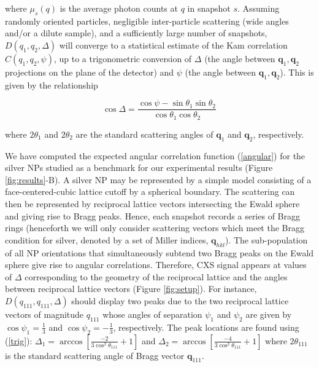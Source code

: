 \documentclass [11pt,fleqn]{article}
\def \be {\begin{equation}}
\def \ee {\end{equation}}
\begin{document}
where $\mu_s( q)$ is the average photon counts at $q$ in snapshot $s$. Assuming randomly oriented particles, negligible inter-particle scattering (wide angles and/or a dilute sample), and a sufficiently large number of snapshots, $D (q_1,q_2, \Delta)$ will converge to a statistical estimate of the Kam correlation $C (q_1,q_2, \psi)$, up to a trigonometric conversion of $\Delta$ (the angle between $\bm q_1, \bm q_2$ projections on the plane of the detector) and $\psi$ (the angle between $\bm q_1, \bm q_2$). This is given by the relationship

\be\label{trig}
\cos \Delta = \frac{\cos \psi - \sin \theta_1 \sin \theta_2  }{ \cos \theta_1 \cos \theta_2} 
\ee

where $2 \theta_1$ and $2 \theta_2$ are the standard scattering angles of $\bm q_1$ and $\bm q_2$, respectively.

We have computed the expected angular correlation function (\ref{angular}) for the silver NPs studied as a benchmark for our experimental results (Figure \ref{fig:results}-B). A silver NP may be represented by a simple model consisting of a face-centered-cubic lattice cutoff by a spherical boundary. The scattering can then be represented by reciprocal lattice vectors intersecting the Ewald sphere and giving rise to Bragg peaks. Hence, each snapshot records a series of Bragg rings (henceforth we will only consider scattering vectors which meet the Bragg condition for silver, denoted by a set of Miller indices, $\bm q_{hkl}$). The sub-population of all NP orientations that simultaneously subtend two Bragg peaks on the Ewald sphere give rise to angular correlations. Therefore,  CXS signal appears at values of $\Delta $ corresponding to the geometry of the reciprocal lattice and the angles between reciprocal lattice vectors (Figure \ref{fig:setup}). For instance, $D (q_{111},q_{111}, \Delta  )$ should display two peaks due to the two reciprocal lattice vectors of magnitude $q_{111}$ whose angles of separation $\psi_1$ and $\psi_2$ are given by $\cos \psi_1 = \frac{1}{3}$ and $\cos \psi_2 = -\frac{1}{3} $, respectively. The peak locations are found using (\ref{trig}):   $\Delta_1 = \arccos[ \frac{-2}{3\cos^{2}\theta_{111}} + 1  ]$ and $\Delta_2 = \arccos[ \frac{-4}{3\cos^{2}\theta_{111}} + 1  ]$ where $2\theta_{111}$ is the standard scattering angle of Bragg vector $\bm q_{111}$.
\end{document}
